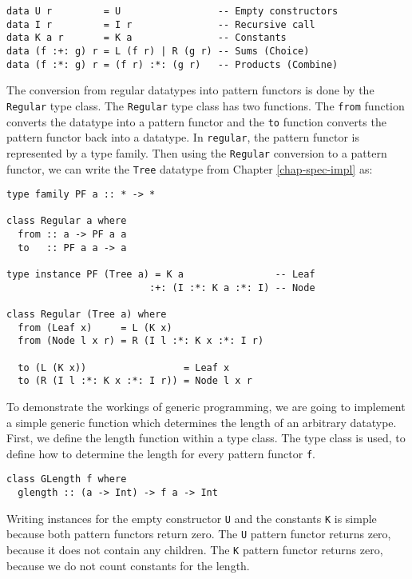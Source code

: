 
\begin{verbatim}
data U r         = U                 -- Empty constructors
data I r         = I r               -- Recursive call
data K a r       = K a               -- Constants
data (f :+: g) r = L (f r) | R (g r) -- Sums (Choice)
data (f :*: g) r = (f r) :*: (g r)   -- Products (Combine)
\end{verbatim}

The conversion from regular datatypes into pattern functors is done by the \texttt{Regular} type class. The \texttt{Regular} type class has two functions. The \texttt{from} function converts the datatype into a pattern functor and the \texttt{to} function converts the pattern functor back into a datatype. In \texttt{regular}, the pattern functor is represented by a type family. Then using the \texttt{Regular} conversion to a pattern functor, we can write the \texttt{Tree} datatype from Chapter \ref{chap-spec-impl} as:

\begin{verbatim}
type family PF a :: * -> *

class Regular a where
  from :: a -> PF a a
  to   :: PF a a -> a

type instance PF (Tree a) = K a                -- Leaf
                         :+: (I :*: K a :*: I) -- Node

class Regular (Tree a) where
  from (Leaf x)     = L (K x)
  from (Node l x r) = R (I l :*: K x :*: I r)                 

  to (L (K x))                 = Leaf x
  to (R (I l :*: K x :*: I r)) = Node l x r
\end{verbatim}

To demonstrate the workings of generic programming, we are going to implement a simple generic function which determines the length of an arbitrary datatype. First, we define the length function within a type class. The type class is used, to define how to determine the length for every pattern functor \texttt{f}. 

\begin{verbatim}
class GLength f where
  glength :: (a -> Int) -> f a -> Int
\end{verbatim}

Writing instances for the empty constructor \texttt{U} and the constants \texttt{K} is simple because both pattern functors return zero. The \texttt{U} pattern functor returns zero, because it does not contain any children. The \texttt{K} pattern functor returns zero, because we do not count constants for the length. 

